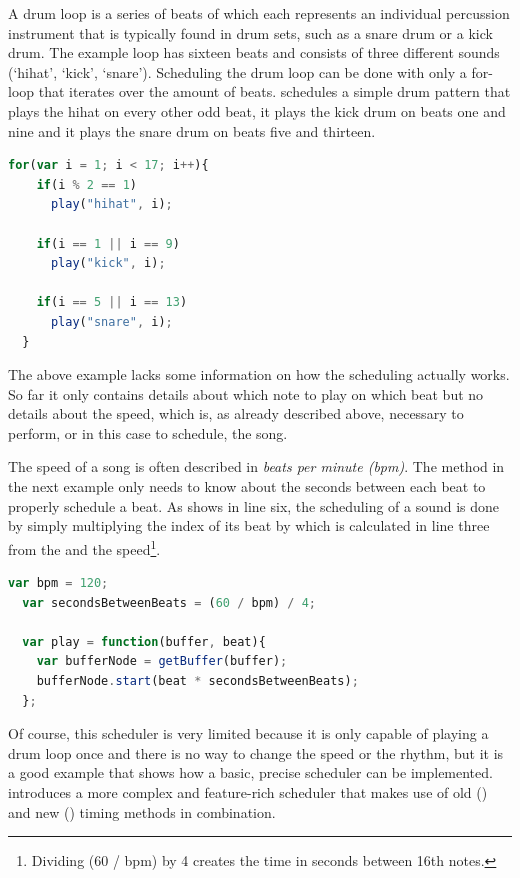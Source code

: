 A drum loop is a series of beats of which each represents an individual percussion instrument that is typically found in drum sets, such as a snare drum or a kick drum. The example loop has sixteen beats and consists of three different sounds (`hihat', `kick', `snare'). Scheduling the drum loop can be done with only a for-loop that iterates over the amount of beats.  schedules a simple drum pattern that plays the hihat on every other odd beat, it plays the kick drum on beats one and nine and it plays the snare drum on beats five and thirteen.

\begin{lstlisting}[language=JavaScript, caption=Scheduling a simple drum loop, label=lst:drumloop]
  for(var i = 1; i < 17; i++){
    if(i % 2 == 1)
      play("hihat", i);

    if(i == 1 || i == 9)
      play("kick", i);

    if(i == 5 || i == 13)
      play("snare", i);
  }
\end{lstlisting}

The above example lacks some information on how the scheduling actually works. So far it only contains details about which note to play on which beat but no details about the speed, which is, as already described above, necessary to perform, or in this case to schedule, the song.

The speed of a song is often described in \emph{beats per minute (bpm)}. The  method in the next example only needs to know about the seconds between each beat to properly schedule a beat. As  shows in line six, the scheduling of a sound is done by simply multiplying the index of its beat by  which is calculated in line three from the  and the speed\footnote{Dividing (60 / bpm) by 4 creates the time in seconds between 16th notes.}.

\begin{lstlisting}[language=JavaScript, caption=Scheduling with a certain speed, label=lst:rhythmscheduling]
  var bpm = 120;
  var secondsBetweenBeats = (60 / bpm) / 4;

  var play = function(buffer, beat){
    var bufferNode = getBuffer(buffer);
    bufferNode.start(beat * secondsBetweenBeats);
  };
\end{lstlisting}

Of course, this scheduler is very limited because it is only capable of playing a drum loop once and there is no way to change the speed or the rhythm, but it is a good example that shows how a basic, precise scheduler can be implemented.  introduces a more complex and feature-rich scheduler that makes use of old () and new () timing methods in combination.

